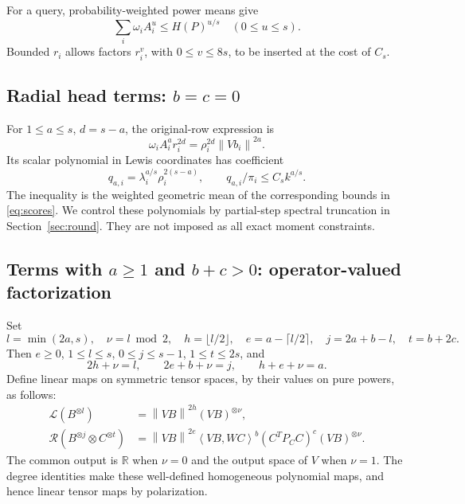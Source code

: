 \documentclass[11pt]{article}
\theoremstyle{remark}\newtheorem{remark}[theorem]{Remark}
\newcommand{\R}{\mathbb R}\newcommand{\E}{\mathbb E}\newcommand{\Prob}{\mathbb P}
\newcommand{\norm}[1]{\left\|#1\right\|}\newcommand{\ip}[2]{\left\langle #1,#2\right\rangle}
\begin{document}
For a query, probability-weighted power means give
\begin{equation}\label{eq:powermean}
 \sum_i\omega_i A_i^u\le H(P)^{u/s}\quad(0\le u\le s).
\end{equation}
Bounded $r_i$ allows factors $r_i^v$, with $0\le v\le8s$, to be inserted at the cost of $C_s$.

\subsection[Radial head terms]{Radial head terms: $b=c=0$}
For $1\le a\le s$, $d=s-a$, the original-row expression is
\[
 \omega_i A_i^ar_i^{2d}=\rho_i^{2d}\norm{Vb_i}^{2a}.
\]
Its scalar polynomial in Lewis coordinates has coefficient
\begin{equation}\label{eq:radial}
 q_{a,i}=\lambda_i^{a/s}\rho_i^{2(s-a)},\qquad q_{a,i}/\pi_i\le C_s k^{a/s}.
\end{equation}
The inequality is the weighted geometric mean of the corresponding bounds in \eqref{eq:scores}. We control these polynomials by partial-step spectral truncation in Section~\ref{sec:round}. They are not imposed as all exact moment constraints.

\subsection[Positive head factors: operator-valued factorization]{Terms with $a\ge1$ and $b+c>0$: operator-valued factorization}\label{sub:operator}
Set
\begin{equation}\label{eq:indices}
 l=\min(2a,s),\quad \nu=l\bmod2,\quad h=\lfloor l/2\rfloor,\quad
 e=a-\lceil l/2\rceil,\quad j=2a+b-l,\quad t=b+2c.
\end{equation}
Then $e\ge0$, $1\le l\le s$, $0\le j\le s-1$, $1\le t\le2s$, and
\begin{equation}\label{eq:indices-identities}
 2h+\nu=l,\qquad 2e+b+\nu=j,\qquad h+e+\nu=a.
\end{equation}
Define linear maps on symmetric tensor spaces, by their values on pure powers, as follows:
\begin{align}
 \mathcal L(B^{\otimes l})&=\norm{VB}^{2h}(VB)^{\otimes\nu},\label{eq:Lmap}\\
 \mathcal R(B^{\otimes j}\otimes C^{\otimes t})
 &=\norm{VB}^{2e}\ip{VB}{WC}^{b}(C^TP_CC)^c(VB)^{\otimes\nu}.\label{eq:Rmap}
\end{align}
The common output is $\R$ when $\nu=0$ and the output space of $V$ when $\nu=1$. The degree identities make these well-defined homogeneous polynomial maps, and hence linear tensor maps by polarization.
\end{document}
